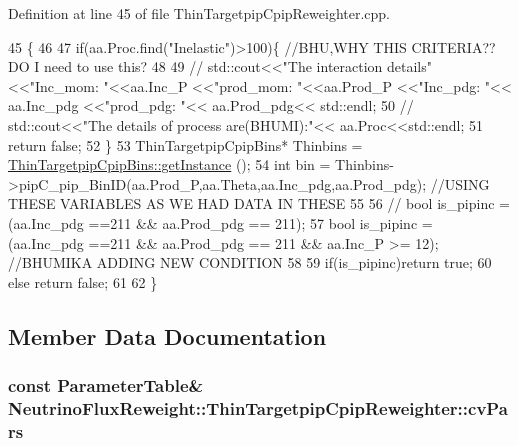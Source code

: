 Definition at line 45 of file Thin\-Targetpip\-Cpip\-Reweighter.\-cpp.


\begin{DoxyCode}
45                                                                         \{
46    
47    \textcolor{keywordflow}{if}(aa.Proc.find(\textcolor{stringliteral}{"Inelastic"})>100)\{       \textcolor{comment}{//BHU,WHY THIS CRITERIA?? DO I need to use this?}
48      
49     \textcolor{comment}{// std::cout<<"The interaction details"<<"Inc\_mom: "<<aa.Inc\_P <<"prod\_mom: "<<aa.Prod\_P <<"Inc\_pdg:
       "<< aa.Inc\_pdg <<"prod\_pdg: "<< aa.Prod\_pdg<< std::endl;}
50    \textcolor{comment}{//  std::cout<<"The details of process are(BHUMI):"<< aa.Proc<<std::endl;}
51     \textcolor{keywordflow}{return} \textcolor{keyword}{false}; 
52      \} 
53     ThinTargetpipCpipBins*  Thinbins =  \hyperlink{class_neutrino_flux_reweight_1_1_thin_targetpip_cpip_bins_aa9b4bec763ea562867a0d8ab9415f2c8}{ThinTargetpipCpipBins::getInstance}
      ();
54     \textcolor{keywordtype}{int} bin = Thinbins->pipC\_pip\_BinID(aa.Prod\_P,aa.Theta,aa.Inc\_pdg,aa.Prod\_pdg); \textcolor{comment}{//USING THESE VARIABLES
       AS WE HAD DATA IN THESE}
55    
56    \textcolor{comment}{// bool is\_pipinc = (aa.Inc\_pdg ==211 && aa.Prod\_pdg == 211);}
57      \textcolor{keywordtype}{bool} is\_pipinc = (aa.Inc\_pdg ==211 && aa.Prod\_pdg == 211 && aa.Inc\_P >= 12);  \textcolor{comment}{//BHUMIKA ADDING NEW
       CONDITION}
58 
59     \textcolor{keywordflow}{if}(is\_pipinc)\textcolor{keywordflow}{return} \textcolor{keyword}{true};
60     \textcolor{keywordflow}{else} \textcolor{keywordflow}{return} \textcolor{keyword}{false};
61     
62   \}
\end{DoxyCode}


\subsection{Member Data Documentation}
\hypertarget{class_neutrino_flux_reweight_1_1_thin_targetpip_cpip_reweighter_a797d9e4a1876dce2d712bd746c038d56}{
\subsubsection[{cv\-Pars}]{\setlength{\rightskip}{0pt plus 5cm}const {\bf Parameter\-Table}\& Neutrino\-Flux\-Reweight\-::\-Thin\-Targetpip\-Cpip\-Reweighter\-::cv\-Pars\hspace{0.3cm}{\ttfamily [private]}}}\label{class_neutrino_flux_reweight_1_1_thin_targetpip_cpip_reweighter_a797d9e4a1876dce2d712bd746c038d56}


